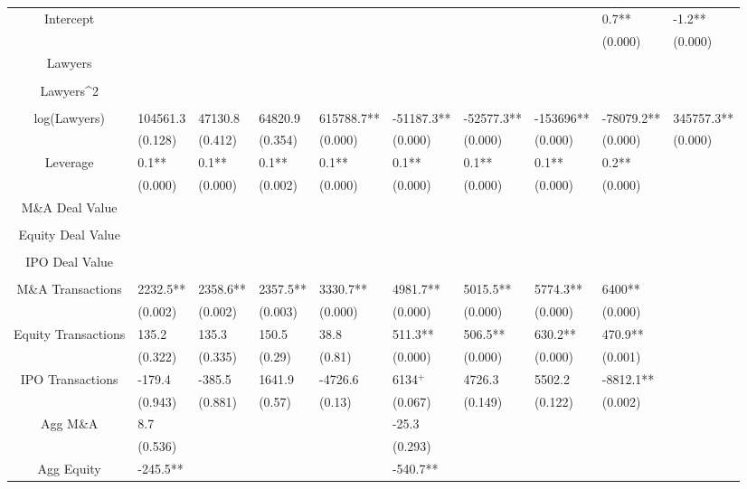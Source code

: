 \documentclass{article}
\begin{document}
\begin{table}[H]
\begin{tabular}{|clllllllll|}
Intercept &  &  &  &  &  &  &  & 0.7** & -1.2** \\ 
   &  &  &  &  &  &  &  & (0.000) & (0.000) \\ 
  Lawyers &  &  &  &  &  &  &  &  &  \\ 
   &  &  &  &  &  &  &  &  &  \\ 
  Lawyers^2 &  &  &  &  &  &  &  &  &  \\ 
   &  &  &  &  &  &  &  &  &  \\ 
  log(Lawyers) & 104561.3 & 47130.8 & 64820.9 & 615788.7** & -51187.3** & -52577.3** & -153696** & -78079.2** & 345757.3** \\ 
   & (0.128) & (0.412) & (0.354) & (0.000) & (0.000) & (0.000) & (0.000) & (0.000) & (0.000) \\ 
  Leverage & 0.1** & 0.1** & 0.1** & 0.1** & 0.1** & 0.1** & 0.1** & 0.2** &  \\ 
   & (0.000) & (0.000) & (0.002) & (0.000) & (0.000) & (0.000) & (0.000) & (0.000) &  \\ 
  M\&A Deal Value &  &  &  &  &  &  &  &  &  \\ 
   &  &  &  &  &  &  &  &  &  \\ 
  Equity Deal Value &  &  &  &  &  &  &  &  &  \\ 
   &  &  &  &  &  &  &  &  &  \\ 
  IPO Deal Value &  &  &  &  &  &  &  &  &  \\ 
   &  &  &  &  &  &  &  &  &  \\ 
  M\&A Transactions & 2232.5** & 2358.6** & 2357.5** & 3330.7** & 4981.7** & 5015.5** & 5774.3** & 6400** &  \\ 
   & (0.002) & (0.002) & (0.003) & (0.000) & (0.000) & (0.000) & (0.000) & (0.000) &  \\ 
  Equity Transactions & 135.2 & 135.3 & 150.5 & 38.8 & 511.3** & 506.5** & 630.2** & 470.9** &  \\ 
   & (0.322) & (0.335) & (0.29) & (0.81) & (0.000) & (0.000) & (0.000) & (0.001) &  \\ 
  IPO Transactions & -179.4 & -385.5 & 1641.9 & -4726.6 & 6134$^{+}$ & 4726.3 & 5502.2 & -8812.1** &  \\ 
   & (0.943) & (0.881) & (0.57) & (0.13) & (0.067) & (0.149) & (0.122) & (0.002) &  \\ 
  Agg M\&A & 8.7 &  &  &  & -25.3 &  &  &  &  \\ 
   & (0.536) &  &  &  & (0.293) &  &  &  &  \\ 
  Agg Equity & -245.5** &  &  &  & -540.7** &  &  &  &  \\ 

\end{tabular}
\end{table}
\end{document}

